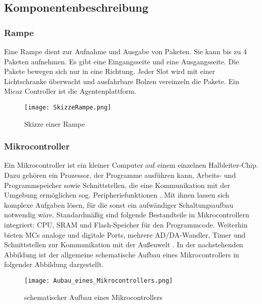 \subsection{Komponentenbeschreibung}
\subsubsection{Rampe}
Eine Rampe dient zur Aufnahme und Ausgabe von Paketen. Sie kann bis zu 4 Paketen aufnehmen. Es gibt eine Eingangsseite und eine Ausgangsseite. Die Pakete bewegen sich nur in eine Richtung. Jeder Slot wird mit einer Lichtschranke überwacht und ausfahrbare Bolzen vereinzeln die Pakete. Ein Micaz Controller ist die Agentenplattform. 
\begin{figure}[h!]
	\centering
		\texttt{[image: SkizzeRampe.png]}
	\caption{Skizze einer Rampe\cite{Stasch:Hahn}}
	\label{SkizzeRampe}
\end{figure}

\subsubsection{Mikrocontroller}
Ein Mikrocontroller ist ein kleiner Computer auf einem einzelnen Halbleiter-Chip. Dazu geh\"oren ein Prozessor,
der Programme ausf\"uhren kann, Arbeits- und Programmspeicher sowie Schnittstellen, die eine Kommunikation mit 
der Umgebung erm\"oglichen sog. Peripheriefunktionen \cite{Wikibooks:2014:Online}. Mit ihnen lassen sich komplexe
Aufgaben l\"osen, f\"ur die sonst ein aufw\"andiger Schaltungsaufbau notwendig w\"are. Standardm\"a{\ss}ig sind folgende Bestandteile in Mikrocontrollern integriert:
CPU, SRAM und Flash-Speicher f\"ur den Programmcode. Weiterhin bieten MCs analoge und digitale Ports, 
mehrere AD/DA-Wandler, Timer und Schnittstellen zur Kommunikation mit der Außenwelt \cite[vgl.]{Viktor:Seib:2014:Online}.
In der nachstehenden Abbildung ist der allgemeine schematische Aufbau eines Mikrocontrollers in folgender Abbildung dargestellt.
\begin{figure}[h!]
	\centering
		\texttt{[image: Aubau\_eines\_Mikrocontrollers.png]}
	\caption{schematischer Aufbau eines Mikrocontrollers \cite{habil:Ostermeye:2014:Online}}
	\label{Aufbau eines Mikrocontrollers}
\end{figure}

